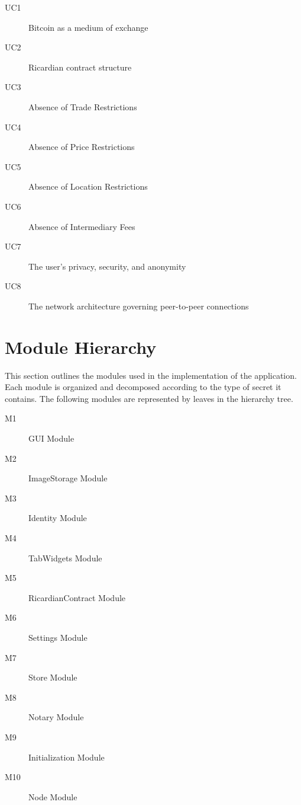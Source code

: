 \documentclass{article}
\begin{document}
\begin{description}
\item[UC1]
Bitcoin as a medium of exchange

\item[UC2]
Ricardian contract structure

\item[UC3]
Absence of Trade Restrictions

\item[UC4]
Absence of Price Restrictions

\item[UC5]
Absence of Location Restrictions

\item[UC6]
Absence of Intermediary Fees

\item[UC7]
The user's privacy, security, and anonymity

\item[UC8]
The network architecture governing peer-to-peer connections



\end{description}

\section*{Module Hierarchy}
This section outlines the modules used in the implementation of the application. Each module is organized and decomposed according to the type of secret it contains. The following modules are represented by leaves in the hierarchy tree.
\begin{description}
\item[M1]
GUI Module
\item[M2]
ImageStorage Module
\item[M3]
Identity Module
\item[M4]
TabWidgets Module
\item[M5]
RicardianContract Module
\item[M6]
Settings Module
\item[M7]
Store Module
\item[M8]
Notary Module
\item[M9]
Initialization Module
\item[M10]
Node Module


\end{description}
\end{document}
